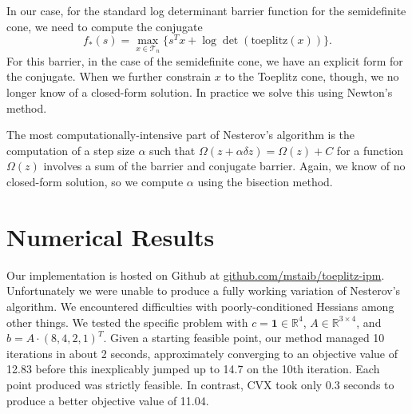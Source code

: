 \documentclass{article}
\begin{document}
In our case, for the standard log determinant barrier function for the semidefinite cone, we need to compute the conjugate
\begin{equation}
f_*(s) = \max_{x \in \mathcal T_n} \{ s^T x + \log\det(\text{toeplitz}(x))\}.
\end{equation}
For this barrier, in the case of the semidefinite cone, we have an explicit
form for the conjugate. When we further constrain $x$ to the Toeplitz cone,
though, we no longer know of a closed-form solution. In practice we solve this
using Newton's method.

The most computationally-intensive part of Nesterov's algorithm is the
computation of a step size $\alpha$ such that $\Omega(z + \alpha \delta z) =
\Omega(z) + C$ for a function $\Omega(z)$ involves a sum of the barrier and
conjugate barrier. Again, we know of no closed-form solution, so we compute
$\alpha$ using the bisection method.

\section{Numerical Results}
Our implementation is hosted on Github at \url{github.com/mstaib/toeplitz-ipm}.
Unfortunately we were unable to produce a fully working variation of Nesterov's
algorithm. We encountered difficulties with poorly-conditioned Hessians among
other things. We tested the specific problem with $c = \mathbf 1 \in \mathbb
R^4$, $A \in \mathbb R^{3\times 4}$, and $b = A \cdot (8,4,2,1)^T$. Given a
starting feasible point, our method managed 10 iterations in about 2 seconds,
approximately converging to an objective value of 12.83 before this
inexplicably jumped up to 14.7 on the 10th iteration. Each point produced was
strictly feasible. In contrast, CVX took only 0.3 seconds to produce a better
objective value of 11.04.


\end{document}
